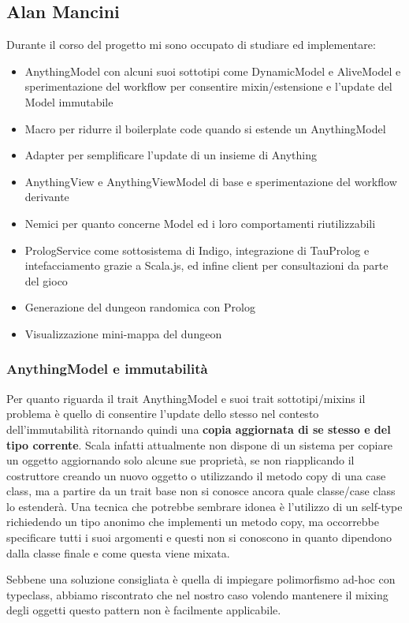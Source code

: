 \subsection{Alan Mancini}
Durante il corso del progetto mi sono occupato di studiare ed implementare:
\begin{itemize}
    \item AnythingModel con alcuni suoi sottotipi come DynamicModel e AliveModel e sperimentazione del workflow per consentire mixin/estensione e l'update del Model immutabile 
    \item Macro per ridurre il boilerplate code quando si estende un AnythingModel
    \item Adapter per semplificare l'update di un insieme di Anything
    \item AnythingView e AnythingViewModel di base e sperimentazione del workflow derivante
    \item Nemici per quanto concerne Model ed i loro comportamenti riutilizzabili
    \item PrologService come sottosistema di Indigo, integrazione di TauProlog e intefacciamento grazie a Scala.js, ed infine client per consultazioni da parte del gioco
    \item Generazione del dungeon randomica con Prolog
    \item Visualizzazione mini-mappa del dungeon
\end{itemize}
\subsubsection{AnythingModel e immutabilità}
Per quanto riguarda il trait AnythingModel e suoi trait sottotipi/mixins il problema è quello di consentire l'update dello stesso nel contesto dell'immutabilità ritornando quindi una \textbf{copia aggiornata di se stesso e del tipo corrente}. 
Scala infatti attualmente non dispone di un sistema per copiare un oggetto aggiornando solo alcune sue proprietà, se non riapplicando il costruttore creando un nuovo oggetto o utilizzando il metodo copy di una case class, ma a partire da un trait base non si conosce ancora quale classe/case class lo estenderà.
Una tecnica che potrebbe sembrare idonea è l'utilizzo di un self-type richiedendo un tipo anonimo che implementi un metodo copy, ma occorrebbe specificare tutti i suoi argomenti e questi non si conoscono in quanto dipendono dalla classe finale e come questa viene mixata.

Sebbene una soluzione consigliata è quella di impiegare polimorfismo ad-hoc con typeclass, abbiamo riscontrato che nel nostro caso volendo mantenere il mixing degli oggetti questo pattern non è facilmente applicabile.

